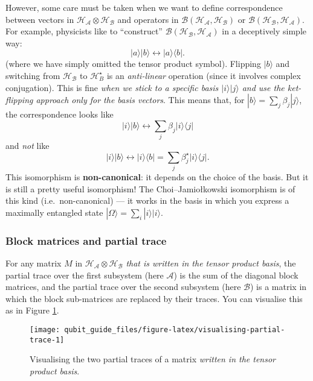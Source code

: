 \documentclass[fleqn]{article}
\begin{document}
However, some care must be taken when we want to define correspondence between vectors in \(\mathcal{H}_{\mathcal{A}}\otimes\mathcal{H}_{\mathcal{B}}\) and operators in \(\mathscr{B}(\mathcal{H}_{\mathcal{A}},\mathcal{H}_{\mathcal{B}})\) or \(\mathscr{B}(\mathcal{H}_{\mathcal{B}},\mathcal{H}_{\mathcal{A}})\).
For example, physicists like to ``construct'' \(\mathscr{B}(\mathcal{H}_{\mathcal{B}},\mathcal{H}_{\mathcal{A}})\) in a deceptively simple way:
\[
  |a\rangle|b\rangle \longleftrightarrow |a\rangle\langle b|.
\]
(where we have simply omitted the tensor product symbol).
Flipping \(|b\rangle\) and switching from \(\mathcal{H}_{\mathcal{B}}\) to \(\mathcal{H}^\star_B\) is an \emph{anti-linear} operation (since it involves complex conjugation).
This is fine \emph{when we stick to a specific basis \(|i\rangle|j\rangle\) and use the ket-flipping approach only for the basis vectors}.
This means that, for \(|b\rangle=\sum_j\beta_j|j\rangle\), the correspondence looks like
\[
  |i\rangle|b\rangle \longleftrightarrow \sum_j \beta_j |i\rangle\langle j|
\]
and \emph{not} like
\[
  |i\rangle|b\rangle \longleftrightarrow |i\rangle\langle b|
  = \sum_j \beta^\star_j |i\rangle\langle j|.
\]
This isomorphism is \textbf{non-canonical}: it depends on the choice of the basis.
But it is still a pretty useful isomorphism!
The Choi--Jamiołkowski isomorphism is of this kind (i.e.~non-canonical) --- it works in the basis in which you express a maximally entangled state \(|\Omega\rangle=\sum_i|i\rangle|i\rangle\).

\hypertarget{block-matrices-and-partial-trace}{%
\subsubsection{Block matrices and partial trace}\label{block-matrices-and-partial-trace}}

For any matrix \(M\) in \(\mathcal{H}_{\mathcal{A}}\otimes\mathcal{H}_{\mathcal{B}}\) \emph{that is written in the tensor product basis}, the partial trace over the first subsystem (here \(\mathcal{A}\)) is the sum of the diagonal block matrices, and the partial trace over the second subsystem (here \(\mathcal{B}\)) is a matrix in which the block sub-matrices are replaced by their traces.
You can visualise this as in Figure \ref{fig:visualising-partial-trace}.



\begin{figure}[H]

{\centering \texttt{[image: qubit\_guide\_files/figure-latex/visualising-partial-trace-1]} 

}

\caption{Visualising the two partial traces of a matrix \emph{written in the tensor product basis}.}\label{fig:visualising-partial-trace}
\end{figure}
\end{document}
